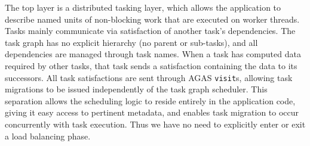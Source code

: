 The top layer is a distributed tasking layer, which allows
the application to describe named units of non-blocking work that are executed 
on worker threads.
Tasks mainly communicate via satisfaction of another task's dependencies.
The task graph has no explicit hierarchy 
(no parent or sub-tasks), and all dependencies are managed through task 
names. When a task has computed data required by other tasks, that task 
sends a satisfaction containing the data to its successors.
All task satisfactions are sent through AGAS {\tt visit}s, allowing 
task migrations to be issued independently of the task graph scheduler.
This separation allows the scheduling logic to reside entirely in the
application code, giving it easy access to pertinent metadata, and
enables task migration to occur concurrently with task execution.
Thus we have no need to explicitly enter or exit a load balancing phase.
